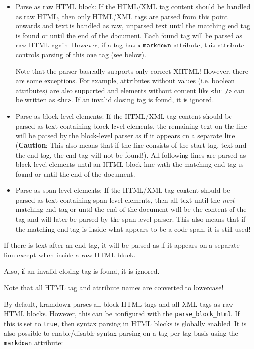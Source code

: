 \documentclass[a4paper]{article}
\begin{document}
\begin{itemize}
\item
  Parse as raw HTML block: If the HTML/XML tag content should be handled
  as raw HTML, then only HTML/XML tags are parsed from this point
  onwards and text is handled as raw, unparsed text until the matching
  end tag is found or until the end of the document. Each found tag will
  be parsed as raw HTML again. However, if a tag has a \texttt{markdown}
  attribute, this attribute controls parsing of this one tag (see
  below).

  Note that the parser basically supports only correct XHTML! However,
  there are some exceptions. For example, attributes without values
  (i.e. boolean attributes) are also supported and elements without
  content like \texttt{\textless{}hr\ /\textgreater{}} can be written as
  \texttt{\textless{}hr\textgreater{}}. If an invalid closing tag is
  found, it is ignored.
\item
  Parse as block-level elements: If the HTML/XML tag content should be
  parsed as text containing block-level elements, the remaining text on
  the line will be parsed by the block-level parser as if it appears on
  a separate line (\textbf{Caution}: This also means that if the line
  consists of the start tag, text and the end tag, the end tag will not
  be found!). All following lines are parsed as block-level elements
  until an HTML block line with the matching end tag is found or until
  the end of the document.
\item
  Parse as span-level elements: If the HTML/XML tag content should be
  parsed as text containing span level elements, then all text until the
  \emph{next} matching end tag or until the end of the document will be
  the content of the tag and will later be parsed by the span-level
  parser. This also means that if the matching end tag is inside what
  appears to be a code span, it is still used!
\end{itemize}

If there is text after an end tag, it will be parsed as if it appears on
a separate line except when inside a raw HTML block.

Also, if an invalid closing tag is found, it is ignored.

Note that all HTML tag and attribute names are converted to lowercase!

By default, kramdown parses all block HTML tags and all XML tags as raw
HTML blocks. However, this can be configured with the
\texttt{parse\_block\_html}. If this is set to \texttt{true}, then
syntax parsing in HTML blocks is globally enabled. It is also possible
to enable/disable syntax parsing on a tag per tag basis using the
\texttt{markdown} attribute:
\end{document}
